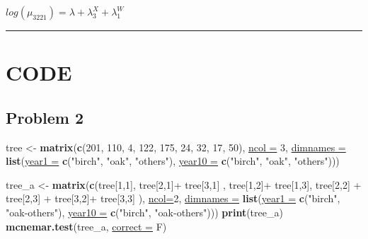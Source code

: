 \documentclass[]{article}
\newenvironment{Shaded}{\begin{snugshade}}{\end{snugshade}}
\newcommand{\KeywordTok}[1]{\textcolor[rgb]{0.26,0.66,0.93}{\textbf{{#1}}}}
\newcommand{\DataTypeTok}[1]{\textcolor[rgb]{0.74,0.68,0.62}{\underline{{#1}}}}
\newcommand{\DecValTok}[1]{\textcolor[rgb]{0.27,0.67,0.26}{{#1}}}
\newcommand{\StringTok}[1]{\textcolor[rgb]{0.02,0.61,0.04}{{#1}}}
\newcommand{\NormalTok}[1]{\textcolor[rgb]{0.74,0.68,0.62}{{#1}}}
\begin{document}
\(log(\mu_{3221}) = \lambda + \lambda_{3}^X + \lambda_{1}^{W}\)

\begin{center}\rule{0.5\linewidth}{\linethickness}\end{center}

\section{CODE}\label{code}

\subsection{Problem 2}\label{problem-2-1}

\begin{Shaded}
\begin{Highlighting}[]
\NormalTok{tree <-}\StringTok{ }\KeywordTok{matrix}\NormalTok{(}\KeywordTok{c}\NormalTok{(}\DecValTok{201}\NormalTok{, }\DecValTok{110}\NormalTok{, }\DecValTok{4}\NormalTok{, }\DecValTok{122}\NormalTok{, }\DecValTok{175}\NormalTok{, }\DecValTok{24}\NormalTok{, }\DecValTok{32}\NormalTok{, }\DecValTok{17}\NormalTok{, }\DecValTok{50}\NormalTok{), }\DataTypeTok{ncol =} \DecValTok{3}\NormalTok{,}
               \DataTypeTok{dimnames =} \KeywordTok{list}\NormalTok{(}\DataTypeTok{year1 =} \KeywordTok{c}\NormalTok{(}\StringTok{"birch"}\NormalTok{, }\StringTok{"oak"}\NormalTok{, }\StringTok{"others"}\NormalTok{),}
                               \DataTypeTok{year10 =} \KeywordTok{c}\NormalTok{(}\StringTok{"birch"}\NormalTok{, }\StringTok{"oak"}\NormalTok{, }\StringTok{"others"}\NormalTok{)))}


\NormalTok{tree_a <-}\StringTok{ }\KeywordTok{matrix}\NormalTok{(}\KeywordTok{c}\NormalTok{(tree[}\DecValTok{1}\NormalTok{,}\DecValTok{1}\NormalTok{], tree[}\DecValTok{2}\NormalTok{,}\DecValTok{1}\NormalTok{]+}\StringTok{ }\NormalTok{tree[}\DecValTok{3}\NormalTok{,}\DecValTok{1}\NormalTok{] , }
                   \NormalTok{tree[}\DecValTok{1}\NormalTok{,}\DecValTok{2}\NormalTok{]+}\StringTok{ }\NormalTok{tree[}\DecValTok{1}\NormalTok{,}\DecValTok{3}\NormalTok{], tree[}\DecValTok{2}\NormalTok{,}\DecValTok{2}\NormalTok{] +}
\StringTok{                       }\NormalTok{tree[}\DecValTok{2}\NormalTok{,}\DecValTok{3}\NormalTok{] +}\StringTok{ }\NormalTok{tree[}\DecValTok{3}\NormalTok{,}\DecValTok{2}\NormalTok{]+}
\StringTok{                       }\NormalTok{tree[}\DecValTok{3}\NormalTok{,}\DecValTok{3}\NormalTok{] ), }\DataTypeTok{ncol=}\DecValTok{2}\NormalTok{,}
                  \DataTypeTok{dimnames =} \KeywordTok{list}\NormalTok{(}\DataTypeTok{year1 =} \KeywordTok{c}\NormalTok{(}\StringTok{"birch"}\NormalTok{, }\StringTok{"oak-others"}\NormalTok{),}
                               \DataTypeTok{year10 =} \KeywordTok{c}\NormalTok{(}\StringTok{"birch"}\NormalTok{, }\StringTok{"oak-others"}\NormalTok{)))}
\KeywordTok{print}\NormalTok{(tree_a)}
\KeywordTok{mcnemar.test}\NormalTok{(tree_a, }\DataTypeTok{correct =} \NormalTok{F)}



\end{Highlighting}
\end{Shaded}
\end{document}
